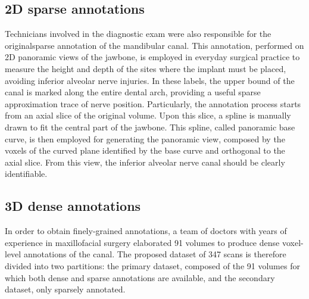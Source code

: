 \subsection{2D sparse annotations}
Technicians involved in the diagnostic exam were also responsible for the
originalsparse annotation of the mandibular canal. This annotation, performed on
2D panoramic views of the jawbone, is employed in everyday surgical practice to
measure the height and depth of the sites where the implant must be placed,
avoiding inferior alveolar nerve injuries. In these labels, the upper bound of
the canal is marked along the entire dental arch, providing a useful sparse
approximation trace of nerve position. Particularly, the annotation process
starts from an axial slice of the original volume. Upon this slice, a spline is
manually drawn to fit the central part of the jawbone. This spline, called
panoramic base curve, is then employed for generating the panoramic view,
composed by the voxels of the curved plane identified by the base curve and
orthogonal to the axial slice. From this view, the inferior alveolar nerve canal
should be clearly identifiable.

\subsection{3D dense annotations}
In order to obtain finely-grained annotations, a team of doctors with years of
experience in maxillofacial surgery elaborated 91 volumes to produce dense
voxel-level annotations of the canal. The proposed dataset of 347 scans is
therefore divided into two partitions: the primary dataset, composed of the 91
volumes for which both dense and sparse annotations are available, and the
secondary dataset, only sparsely annotated.

